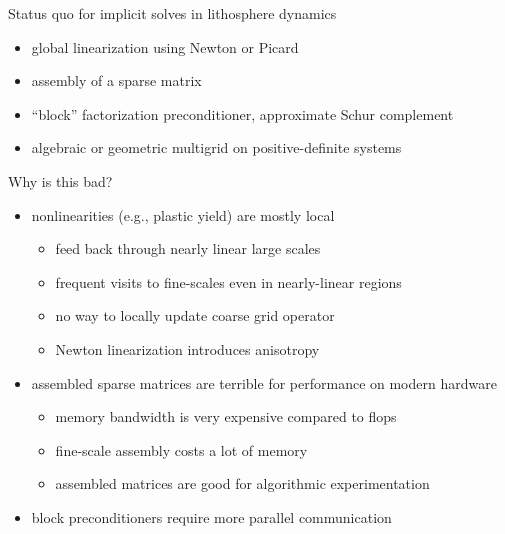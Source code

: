 \documentclass{beamer}
\begin{document}
\begin{frame}{Status quo for implicit solves in lithosphere dynamics}
  \begin{itemize}
  \item global linearization using Newton or Picard
  \item assembly of a sparse matrix
  \item ``block'' factorization preconditioner, approximate Schur complement
  \item algebraic or geometric multigrid on positive-definite systems
  \end{itemize}
  \begin{block}{Why is this bad?}
    \vspace{-1em}
    \begin{itemize}
    \item nonlinearities (e.g., plastic yield) are mostly local
      \begin{itemize}
      \item feed back through nearly linear large scales
      \item frequent visits to fine-scales even in nearly-linear regions
      \item no way to locally update coarse grid operator
      \item Newton linearization introduces anisotropy
      \end{itemize}
    \item assembled sparse matrices are terrible for performance on modern hardware
      \begin{itemize}
      \item memory bandwidth is very expensive compared to flops
      \item fine-scale assembly costs a lot of memory
      \item assembled matrices are good for algorithmic experimentation
      \end{itemize}
    \item block preconditioners require more parallel communication
    \end{itemize}
  \end{block}
\end{frame}
\end{document}
